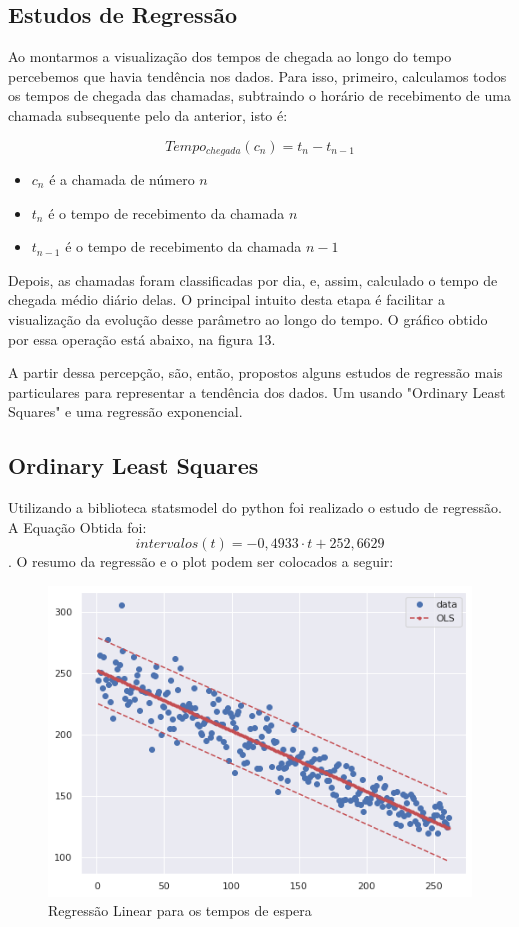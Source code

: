 \subsection{Estudos de Regressão}

Ao montarmos a visualização dos tempos de chegada ao longo do tempo percebemos que havia tendência nos dados. Para isso, primeiro, calculamos todos os tempos de chegada das chamadas, subtraindo o horário de recebimento de uma chamada subsequente pelo da anterior, isto é:

$$Tempo_{chegada}(c_n) = t_n - t_{n-1}$$ 

\begin{itemize}
    \item $c_n$ é a chamada de número $n$
    \item $t_n$ é o tempo de recebimento da chamada $n$
    \item $t_{n-1}$ é o tempo de recebimento da chamada $n-1$
\end{itemize}

Depois, as chamadas foram classificadas por dia, e, assim, calculado o tempo de chegada médio diário delas. O principal intuito desta etapa é facilitar a visualização da evolução desse parâmetro ao longo do tempo. O gráfico obtido por essa operação está abaixo, na figura 13.

A partir dessa percepção, são, então, propostos alguns estudos de regressão mais particulares para representar a tendência dos dados. Um usando "Ordinary Least Squares" e uma regressão exponencial.  

\subsection{Ordinary Least Squares}

Utilizando a biblioteca statsmodel do python foi realizado o estudo de regressão. A Equação Obtida foi: $$intervalos(t) = -0,4933 \cdot t + 252,6629$$. O resumo da regressão e o plot podem ser colocados a seguir: 

\begin{figure}[H]
    \includegraphics{analise-de-dados/regressao/regressao_OLS.png}
    \caption{Regressão Linear para os tempos de espera}
    \label{fig: plot_OLS}
\end{figure}

